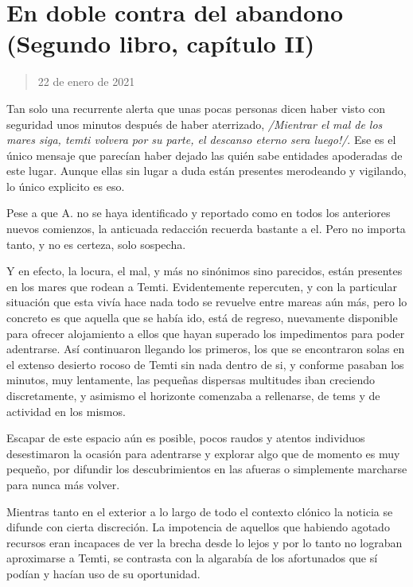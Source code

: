 \documentclass[
  spanish,
]{book}
\begin{document}
\hypertarget{en-doble-contra-del-abandono-segundo-libro-capuxedtulo-ii}{%
\section{En doble contra del abandono (Segundo libro, capítulo II)}\label{en-doble-contra-del-abandono-segundo-libro-capuxedtulo-ii}}

\begin{quote}
22 de enero de 2021
\end{quote}

Tan solo una recurrente alerta que unas pocas personas dicen haber visto con seguridad unos minutos después de haber aterrizado, \emph{/Mientrar el mal de los mares siga, temti volvera por su parte, el descanso eterno sera luego!/}. Ese es el único mensaje que parecían haber dejado las quién sabe entidades apoderadas de este lugar. Aunque ellas sin lugar a duda están presentes merodeando y vigilando, lo único explicito es eso.

Pese a que A. no se haya identificado y reportado como en todos los anteriores nuevos comienzos, la anticuada redacción recuerda bastante a el. Pero no importa tanto, y no es certeza, solo sospecha.

Y en efecto, la locura, el mal, y más no sinónimos sino parecidos, están presentes en los mares que rodean a Temti. Evidentemente repercuten, y con la particular situación que esta vivía hace nada todo se revuelve entre mareas aún más, pero lo concreto es que aquella que se había ido, está de regreso, nuevamente disponible para ofrecer alojamiento a ellos que hayan superado los impedimentos para poder adentrarse. Así continuaron llegando los primeros, los que se encontraron solas en el extenso desierto rocoso de Temti sin nada dentro de si, y conforme pasaban los minutos, muy lentamente, las pequeñas dispersas multitudes iban creciendo discretamente, y asimismo el horizonte comenzaba a rellenarse, de tems y de actividad en los mismos.

Escapar de este espacio aún es posible, pocos raudos y atentos individuos desestimaron la ocasión para adentrarse y explorar algo que de momento es muy pequeño, por difundir los descubrimientos en las afueras o simplemente marcharse para nunca más volver.

Mientras tanto en el exterior a lo largo de todo el contexto clónico la noticia se difunde con cierta discreción. La impotencia de aquellos que habiendo agotado recursos eran incapaces de ver la brecha desde lo lejos y por lo tanto no lograban aproximarse a Temti, se contrasta con la algarabía de los afortunados que sí podían y hacían uso de su oportunidad.
\end{document}

